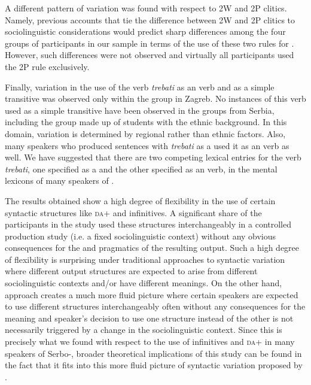 \documentclass[output=paper,modfonts,newtxmath,hidelinks,]{langscibook}
\begin{document}
A different pattern of variation was found with respect to 2W and 2P clitics. Namely, previous accounts that tie the difference between 2W and 2P clitics to sociolinguistic considerations would predict sharp differences among the four groups of participants in our sample in terms of the use of these two rules for . However, such differences were not observed and virtually all participants used the 2P rule exclusively.\largerpage

Finally, variation in the use of the verb \textit{trebati} as an  verb and as a simple transitive was observed only within the group in Zagreb. No instances of this verb used as a simple transitive have been observed in the groups from Serbia, including the group made up of students with the  ethnic background. In this domain, variation is determined by regional rather than ethnic factors. Also, many speakers who produced sentences with \textit{trebati} as a  used it as an  verb as well. We have suggested that there are two competing lexical entries for the verb \textit{trebati}, one specified as a  and the other specified as an  verb, in the mental lexicons of many speakers of . 

The results obtained show a high degree of flexibility in the use of certain syntactic structures like \textsc{da}+ and infinitives. A significant share of the participants in the study used these structures interchangeably in a controlled production study (i.e. a fixed sociolinguistic context) without any obvious consequences for the  and pragmatics of the resulting output. Such a high degree of flexibility is surprising under traditional approaches to syntactic variation where different output structures are expected to arise from different sociolinguistic contexts and/or have different meanings. On the other hand,  approach creates a much more fluid picture where certain speakers are expected to use different structures interchangeably often without any consequences for the meaning and speaker’s decision to use one structure instead of the other is not necessarily triggered by a change in the sociolinguistic context. Since this is precisely what we found with respect to the use of infinitives and \textsc{da}+ in many speakers of Serbo-, broader theoretical implications of this study can be found in the fact that it fits into this more fluid picture of syntactic variation proposed by \citet{Adger2006}.
\end{document}
